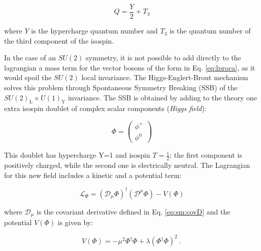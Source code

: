 \begin{equation}
Q = \frac{Y}{2} + T_3
\label{eq:sm:Q}
\end{equation}

\noindent where $Y$ is the hypercharge quantum number and $T_3$ is the quantum number of the third component of the isospin. 

In the case of an $SU(2)$ symmetry, it is not possible to add directly to the lagrangian a mass term for the vector bosons of the form in Eq. \ref{eq:lproca}, as it would spoil the $SU(2)$ local invariance. The Higgs-Englert-Brout mechanism \cite{Englert:1964et}\cite{Higgs:1964pj}\cite{Higgs:1964ia} solves this problem through Spontaneous Symmetry Breaking (SSB) of the $SU(2)_\mathrm{L} \times U(1)_\mathrm{Y}$ invariance. The SSB is obtained by adding to the theory one extra isospin doublet of complex scalar components (\textit{Higgs field}):

\begin{equation}
	\Phi = \left( \begin{array}{c} \phi^+  \\ \phi^0 \end{array} \right)
\end{equation}

This doublet has hypercharge Y=1 and isospin $T=\frac{1}{2}$; the first component is positively charged, while the second one is electrically neutral. The Lagrangian for this new field includes a kinetic and a potential term:

\begin{equation}
	\mathcal{L}_{\Phi} = ( \mathcal{D}_{\mu} \Phi)^{\dagger} (\mathcal{D}^{\mu} \Phi) - V(\Phi) 
	\label{eq:LHiggs}
\end{equation}

\noindent where $\mathcal{D}_{\mu}$ is the covariant derivative defined in Eq. \ref{eq:sm:covD} and the potential $V(\Phi)$ is given by:

\begin{equation}
 V(\Phi) = - \mu^2 \Phi^{\dagger} \Phi + \lambda (\Phi^{\dagger} \Phi)^2 \, . \
	\label{eq:hpot}
\end{equation}

